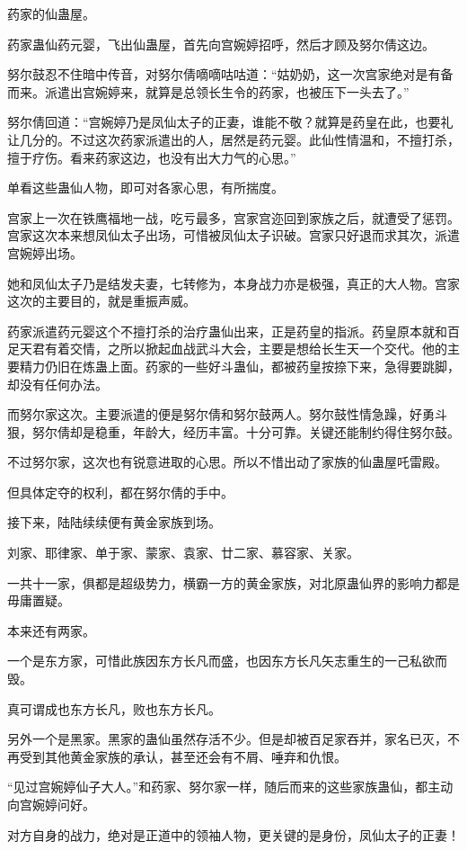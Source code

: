 \begin{this_body}
药家的仙蛊屋。

药家蛊仙药元婴，飞出仙蛊屋，首先向宫婉婷招呼，然后才顾及努尔倩这边。

努尔鼓忍不住暗中传音，对努尔倩嘀嘀咕咕道：“姑奶奶，这一次宫家绝对是有备而来。派遣出宫婉婷来，就算是总领长生令的药家，也被压下一头去了。”

努尔倩回道：“宫婉婷乃是凤仙太子的正妻，谁能不敬？就算是药皇在此，也要礼让几分的。不过这次药家派遣出的人，居然是药元婴。此仙性情温和，不擅打杀，擅于疗伤。看来药家这边，也没有出大力气的心思。”

单看这些蛊仙人物，即可对各家心思，有所揣度。

宫家上一次在铁鹰福地一战，吃亏最多，宫家宫迩回到家族之后，就遭受了惩罚。宫家这次本来想凤仙太子出场，可惜被凤仙太子识破。宫家只好退而求其次，派遣宫婉婷出场。

她和凤仙太子乃是结发夫妻，七转修为，本身战力亦是极强，真正的大人物。宫家这次的主要目的，就是重振声威。

药家派遣药元婴这个不擅打杀的治疗蛊仙出来，正是药皇的指派。药皇原本就和百足天君有着交情，之所以掀起血战武斗大会，主要是想给长生天一个交代。他的主要精力仍旧在炼蛊上面。药家的一些好斗蛊仙，都被药皇按捺下来，急得要跳脚，却没有任何办法。

而努尔家这次。主要派遣的便是努尔倩和努尔鼓两人。努尔鼓性情急躁，好勇斗狠，努尔倩却是稳重，年龄大，经历丰富。十分可靠。关键还能制约得住努尔鼓。

不过努尔家，这次也有锐意进取的心思。所以不惜出动了家族的仙蛊屋吒雷殿。

但具体定夺的权利，都在努尔倩的手中。

接下来，陆陆续续便有黄金家族到场。

刘家、耶律家、单于家、蒙家、袁家、廿二家、慕容家、关家。

一共十一家，俱都是超级势力，横霸一方的黄金家族，对北原蛊仙界的影响力都是毋庸置疑。

本来还有两家。

一个是东方家，可惜此族因东方长凡而盛，也因东方长凡矢志重生的一己私欲而毁。

真可谓成也东方长凡，败也东方长凡。

另外一个是黑家。黑家的蛊仙虽然存活不少。但是却被百足家吞并，家名已灭，不再受到其他黄金家族的承认，甚至还会有不屑、唾弃和仇恨。

“见过宫婉婷仙子大人。”和药家、努尔家一样，随后而来的这些家族蛊仙，都主动向宫婉婷问好。

对方自身的战力，绝对是正道中的领袖人物，更关键的是身份，凤仙太子的正妻！


\end{this_body}
